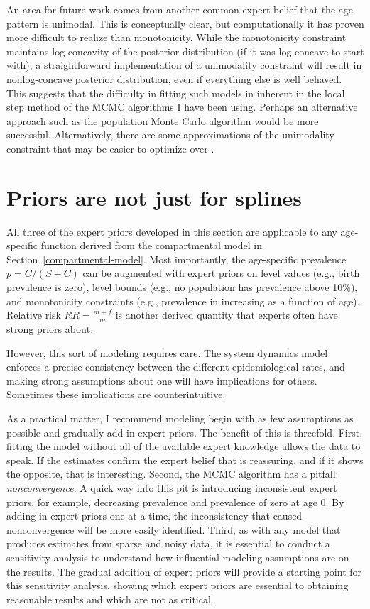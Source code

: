 An area for future work comes from another common expert belief that
the age pattern is unimodal.  This is conceptually clear, but
computationally it has proven more difficult to realize than
monotonicity.  While the monotonicity constraint maintains
log-concavity of the posterior distribution (if it was log-concave to
start with), a straightforward implementation of a unimodality
constraint will result in nonlog-concave posterior distribution, even
if everything else is well behaved.  This suggests that the difficulty
in fitting such models in inherent in the local step method of the
MCMC algorithms I have been using.  Perhaps an alternative approach
such as the population Monte Carlo algorithm would be more successful.
Alternatively, there are some approximations of the unimodality
constraint that may be easier to optimize over \cite{Papp[KP6]]}.

\section{Priors are not just for splines}
All three of the expert priors developed in this section are
applicable to any age-specific function derived from the compartmental
model in Section~\ref{compartmental-model}. Most importantly, the
age-specific prevalence $p = C/(S+C)$ can be augmented with expert
priors on level values (e.g., birth prevalence is zero), level bounds
(e.g., no population has prevalence above 10\%), and monotonicity
constraints (e.g., prevalence in increasing as a function of
age). Relative risk $RR = \frac{m+f}{m}$ is another derived quantity that
experts often have strong priors about.

However, this sort of modeling requires care. The system dynamics
model enforces a precise consistency between the different
epidemiological rates, and making strong assumptions about one will
have implications for others.  Sometimes these implications are
counterintuitive.

As a practical matter, I recommend modeling begin with as few
assumptions as possible and gradually add in expert priors. The
benefit of this is threefold.  First, fitting the model without all of
the available expert knowledge allows the data to speak.  If the estimates
confirm the expert belief that is reassuring, and if it shows the
opposite, that is interesting. Second, the MCMC algorithm has a
pitfall: \emph{nonconvergence}. A quick way into this pit is
introducing inconsistent expert priors, for example, decreasing
prevalence and prevalence of zero at age $0$. By adding in expert
priors one at a time, the inconsistency that caused nonconvergence
will be more easily identified. Third, as with any model that produces
estimates from sparse and noisy data, it is essential to conduct a
sensitivity analysis to understand how influential modeling
assumptions are on the results.  The gradual addition of expert priors
will provide a starting point for this sensitivity analysis, showing
which expert priors are essential to obtaining reasonable results and
which are not as critical.

